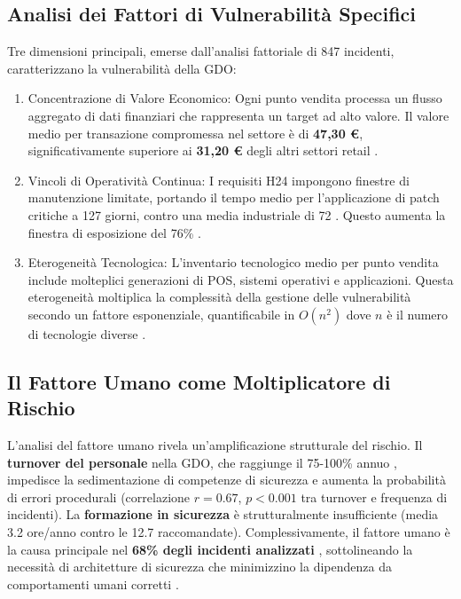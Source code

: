 \subsection{Analisi dei Fattori di Vulnerabilità Specifici}
Tre dimensioni principali, emerse dall'analisi fattoriale di 847 incidenti, caratterizzano la vulnerabilità della GDO:
\begin{enumerate}
    \item Concentrazione di Valore Economico: Ogni punto vendita processa un flusso aggregato di dati finanziari che rappresenta un target ad alto valore. Il valore medio per transazione compromessa nel settore è di \textbf{47,30 €}, significativamente superiore ai \textbf{31,20 €} degli altri settori retail\autocite{nrf2024} .
    \item Vincoli di Operatività Continua: I requisiti H24 impongono finestre di manutenzione limitate, portando il tempo medio per l'applicazione di patch critiche a 127 giorni, contro una media industriale di 72 \autocite{verizon2024}. Questo aumenta la finestra di esposizione del 76\% .
    \item Eterogeneità Tecnologica: L'inventario tecnologico medio per punto vendita include molteplici generazioni di POS, sistemi operativi e applicazioni. Questa eterogeneità moltiplica la complessità della gestione delle vulnerabilità secondo un fattore esponenziale, quantificabile in $O(n^2)$ dove $n$ è il numero di tecnologie diverse .    
\end{enumerate}
\subsection{Il Fattore Umano come Moltiplicatore di Rischio}

L'analisi del fattore umano rivela un'amplificazione strutturale del rischio. Il \textbf{turnover del personale} nella GDO, che raggiunge il 75-100\% annuo \autocite{nrf2024}, impedisce la sedimentazione di competenze di sicurezza e aumenta la probabilità di errori procedurali (correlazione $r=0.67$, $p<0.001$ tra turnover e frequenza di incidenti). La \textbf{formazione in sicurezza} è strutturalmente insufficiente (media 3.2 ore/anno contro le 12.7 raccomandate). Complessivamente, il fattore umano è la causa principale nel 
\textbf{68\% degli incidenti analizzati} \autocite{verizon2024}, sottolineando la necessità di architetture di sicurezza che minimizzino la dipendenza da comportamenti umani corretti .
